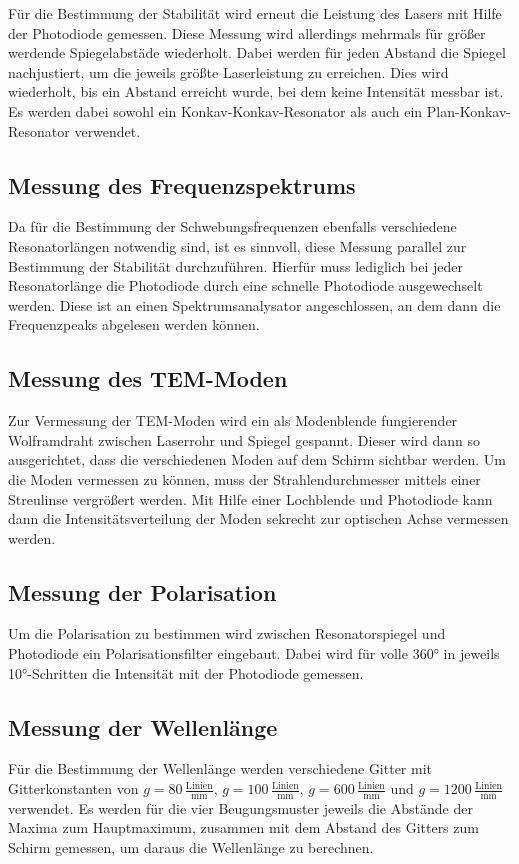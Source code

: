 Für die Bestimmung der Stabilität wird erneut die Leistung des Lasers mit Hilfe der Photodiode gemessen. Diese Messung wird allerdings mehrmals für größer werdende
Spiegelabstäde wiederholt. Dabei werden für jeden Abstand die Spiegel nachjustiert, um die jeweils größte Laserleistung zu erreichen. Dies wird wiederholt, bis
ein Abstand erreicht wurde, bei dem keine Intensität messbar ist. Es werden dabei sowohl ein Konkav-Konkav-Resonator als auch ein Plan-Konkav-Resonator verwendet.


\subsection{Messung des Frequenzspektrums}

Da für die Bestimmung der Schwebungsfrequenzen ebenfalls verschiedene Resonatorlängen notwendig sind, ist es sinnvoll, diese Messung parallel zur Bestimmung der Stabilität
durchzuführen. Hierfür muss lediglich bei jeder Resonatorlänge die Photodiode durch eine schnelle Photodiode ausgewechselt werden. Diese ist an einen Spektrumsanalysator
angeschlossen, an dem dann die Frequenzpeaks abgelesen werden können. 


\subsection{Messung des TEM-Moden}

Zur Vermessung der TEM-Moden wird ein als Modenblende fungierender Wolframdraht zwischen Laserrohr und Spiegel gespannt. Dieser wird dann so ausgerichtet, dass
die verschiedenen Moden auf dem Schirm sichtbar werden. Um die Moden vermessen zu können, muss der Strahlendurchmesser mittels einer Streulinse vergrößert werden.
Mit Hilfe einer Lochblende und Photodiode kann dann die Intensitätsverteilung der Moden sekrecht zur optischen Achse vermessen werden.


\subsection{Messung der Polarisation}

Um die Polarisation zu bestimmen wird zwischen Resonatorspiegel und Photodiode ein Polarisationsfilter eingebaut. Dabei wird für volle 360° in jeweils 10°-Schritten
die Intensität mit der Photodiode gemessen. 


\subsection{Messung der Wellenlänge}

Für die Bestimmung der Wellenlänge werden verschiedene Gitter mit Gitterkonstanten von $g = 80\, \frac{\text{Linien}}{\si{\milli\metre}}$,
$g = 100\, \frac{\text{Linien}}{\si{\milli\metre}}$,
$g = 600\, \frac{\text{Linien}}{\si{\milli\metre}}$ und $g = 1200\, \frac{\text{Linien}}{\si{\milli\metre}}$ verwendet. Es werden für die vier Beugungsmuster
jeweils die Abstände der Maxima zum Hauptmaximum, zusammen mit dem Abstand des Gitters zum Schirm gemessen, um daraus die Wellenlänge zu berechnen.
